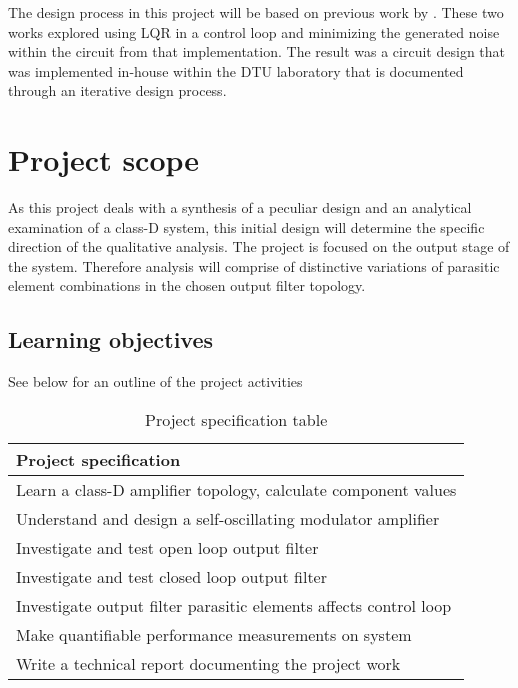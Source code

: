 The design process in this project will be based on previous work by \cite{multivar_ctrl_loops_for_SM_audio_systems,nagy_special_course}. These two works explored using LQR in a control loop and minimizing the generated noise within the circuit from that implementation. The result was a circuit design that was implemented in-house within the DTU laboratory that is documented through an iterative design process.

\section{Project scope}
As this project deals with a synthesis of a peculiar design and an analytical examination of a class-D system, this initial design will determine the specific direction of the qualitative analysis. The project is focused on the output stage of the system. Therefore analysis will comprise of distinctive variations of parasitic element combinations in the chosen output filter topology.

\subsection{Learning objectives}
See below for an outline of the project activities
\begin{table}[htbp]
    \centering
    \begin{tabular}{@{}l@{}}
    	\toprule
        \textbf{Project specification}									\\ \midrule
        Learn a class-D amplifier topology, calculate component values	\\
        Understand and design a self-oscillating modulator amplifier	\\
        Investigate and test open loop output filter					\\
        Investigate and test closed loop output filter					\\
        Investigate output filter parasitic elements affects control loop\\
        Make quantifiable performance measurements on system			\\
        Write a technical report documenting the project work			\\ \bottomrule
    \end{tabular}
    \caption{Project specification table}
    \label{tab:specifications}
\end{table}